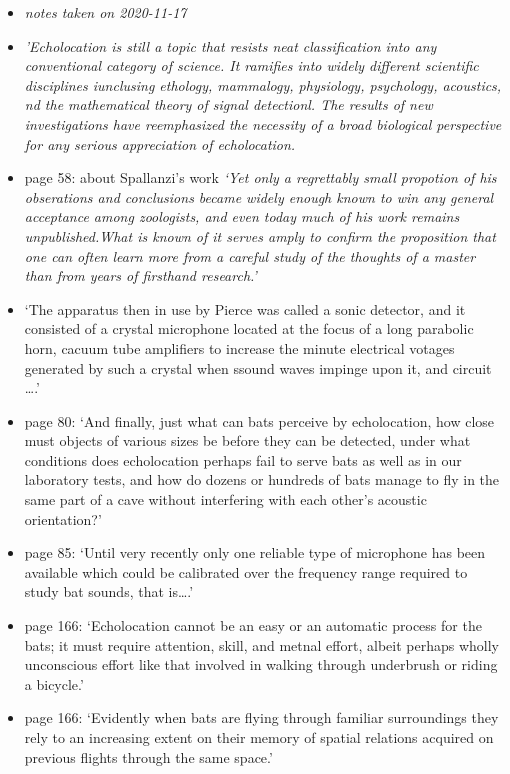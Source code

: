 \documentclass[
]{book}
\begin{document}
\begin{itemize}
\item
  \emph{notes taken on 2020-11-17}
\item
  \emph{'Echolocation is still a topic that resists neat classification into any conventional category of science. It ramifies into widely different scientific disciplines iunclusing ethology, mammalogy, physiology, psychology, acoustics, nd the mathematical theory of signal detectionl. The results of new investigations have reemphasized the necessity of a broad biological perspective for any serious appreciation of echolocation. }
\item
  page 58: about Spallanzi's work \emph{`Yet only a regrettably small propotion of his obserations and conclusions became widely enough known to win any general acceptance among zoologists, and even today much of his work remains unpublished.What is known of it serves amply to confirm the proposition that one can often learn more from a careful study of the thoughts of a master than from years of firsthand research.'}
\item
  `The apparatus then in use by Pierce was called a sonic detector, and it consisted of a crystal microphone located at the focus of a long parabolic horn, cacuum tube amplifiers to increase the minute electrical votages generated by such a crystal when ssound waves impinge upon it, and circuit \ldots.'
\item
  page 80: `And finally, just what can bats perceive by echolocation, how close must objects of various sizes be before they can be detected, under what conditions does echolocation perhaps fail to serve bats as well as in our laboratory tests, and how do dozens or hundreds of bats manage to fly in the same part of a cave without interfering with each other's acoustic orientation?'
\item
  page 85: `Until very recently only one reliable type of microphone has been available which could be calibrated over the frequency range required to study bat sounds, that is\ldots.'
\item
  page 166: `Echolocation cannot be an easy or an automatic process for the bats; it must require attention, skill, and metnal effort, albeit perhaps wholly unconscious effort like that involved in walking through underbrush or riding a bicycle.'
\item
  page 166: `Evidently when bats are flying through familiar surroundings they rely to an increasing extent on their memory of spatial relations acquired on previous flights through the same space.'

\end{itemize}
\end{document}
